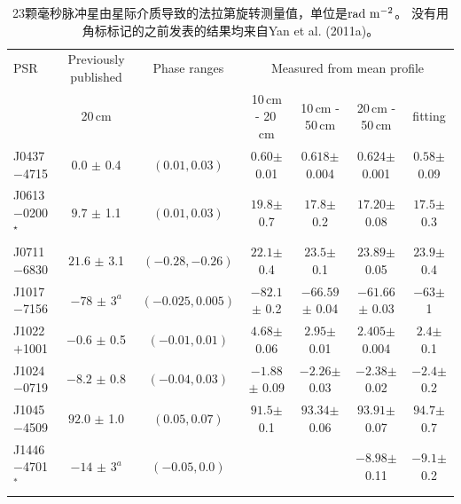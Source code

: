 \begin{landscape}
\begin{table}
\centering
\caption{23颗毫秒脉冲星由星际介质导致的法拉第旋转测量值，单位是$\rm{rad\ m^{-2}}$。 
没有用角标标记的之前发表的结果均来自Yan et al. (2011a)。}
\label{rm}
\begin{tabular}{lcccccc}
\hline
PSR          &    Previously published &  Phase ranges        &    \multicolumn{4}{c}{Measured from mean profile}                   \\  
             &    20\,cm               &                      &    10\,cm - 20\,cm  &  10\,cm - 50\,cm   &  20\,cm - 50\,cm   &    fitting      \\   
\hline
J0437$-$4715            & $0.0   $ $\pm$ 0.4      &  $(0.01, 0.03)   $ & $0.60   $$\pm$ 0.01  & $0.618   $$\pm$ 0.004 &  $0.624   $$\pm$ 0.001 &  $0.58   $$\pm$ 0.09   \\  
J0613$-$0200$^\star$    & $9.7   $ $\pm$ 1.1      &  $(0.01, 0.03)   $ & $19.8   $$\pm$ 0.7   & $17.8    $$\pm$ 0.2   &  $17.20   $$\pm$ 0.08  &  $17.5   $$\pm$ 0.3   \\  
J0711$-$6830            & $21.6  $ $\pm$ 3.1      &  $(-0.28, -0.26) $ & $22.1   $$\pm$ 0.4   & $23.5    $$\pm$ 0.1   &  $23.89   $$\pm$ 0.05  &  $23.9   $$\pm$ 0.4   \\  
J1017$-$7156            & $-78   $ $\pm$ $3^a$    &  $(-0.025, 0.005)$ & $-82.1  $$\pm$ 0.2   & $-66.59  $$\pm$ 0.04  &  $-61.66  $$\pm$ 0.03  &  $-63    $$\pm$ 1    \\
J1022$+$1001            & $-0.6  $ $\pm$ 0.5      &  $(-0.01, 0.01)  $ & $4.68   $$\pm$ 0.06  & $2.95    $$\pm$ 0.01  &  $2.405   $$\pm$ 0.004 &  $2.4    $$\pm$ 0.1   \\  
J1024$-$0719            & $-8.2  $ $\pm$ 0.8      &  $(-0.04, 0.03)  $ & $-1.88  $$\pm$ 0.09  & $-2.26   $$\pm$ 0.03  &  $-2.38   $$\pm$ 0.02  &  $-2.4   $$\pm$ 0.2    \\  
J1045$-$4509            & $92.0  $ $\pm$ 1.0      &  $(0.05, 0.07)   $ & $91.5   $$\pm$ 0.1   & $93.34   $$\pm$ 0.06  &  $93.91   $$\pm$ 0.07  &  $94.7   $$\pm$ 0.7    \\  
J1446$-$4701$^\ast$     & $-14   $ $\pm$ $3^a$    &  $(-0.05, 0.0)   $ &                      &                       &  $-8.98   $$\pm$ 0.11  &  $-9.1   $$\pm$ 0.2    \\

\end{tabular}
\end{table}
\end{landscape}
